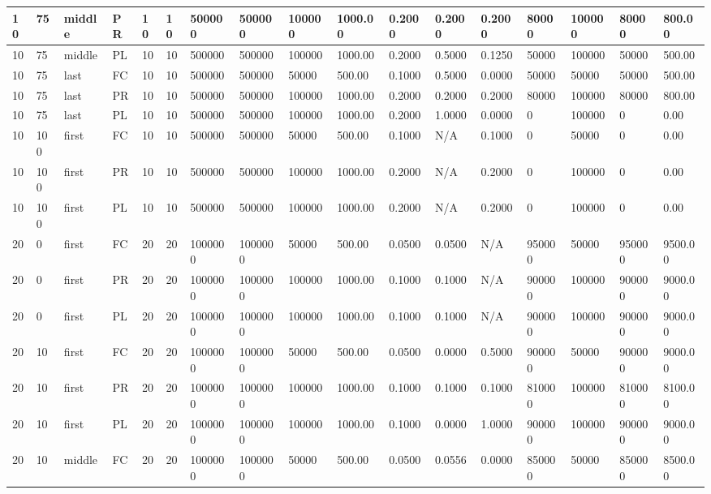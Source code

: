 \begin{tabular}{|l|l|l|l|l|l|l|l|l|l|l|l|l|l|l|l|l|}
10 & 75 & middle & PR & 10 & 10 & 500000 & 500000 & 100000 & 1000.00 & 0.2000 & 0.2000 & 0.2000 & 80000 & 100000 & 80000 & 800.00 \\ \hline
10 & 75 & middle & PL & 10 & 10 & 500000 & 500000 & 100000 & 1000.00 & 0.2000 & 0.5000 & 0.1250 & 50000 & 100000 & 50000 & 500.00 \\ \hline
10 & 75 & last & FC & 10 & 10 & 500000 & 500000 & 50000 & 500.00 & 0.1000 & 0.5000 & 0.0000 & 50000 & 50000 & 50000 & 500.00 \\ \hline
10 & 75 & last & PR & 10 & 10 & 500000 & 500000 & 100000 & 1000.00 & 0.2000 & 0.2000 & 0.2000 & 80000 & 100000 & 80000 & 800.00 \\ \hline
10 & 75 & last & PL & 10 & 10 & 500000 & 500000 & 100000 & 1000.00 & 0.2000 & 1.0000 & 0.0000 & 0 & 100000 & 0 & 0.00 \\ \hline
10 & 100 & first & FC & 10 & 10 & 500000 & 500000 & 50000 & 500.00 & 0.1000 & N/A & 0.1000 & 0 & 50000 & 0 & 0.00 \\ \hline
10 & 100 & first & PR & 10 & 10 & 500000 & 500000 & 100000 & 1000.00 & 0.2000 & N/A & 0.2000 & 0 & 100000 & 0 & 0.00 \\ \hline
10 & 100 & first & PL & 10 & 10 & 500000 & 500000 & 100000 & 1000.00 & 0.2000 & N/A & 0.2000 & 0 & 100000 & 0 & 0.00 \\ \hline
20 & 0 & first & FC & 20 & 20 & 1000000 & 1000000 & 50000 & 500.00 & 0.0500 & 0.0500 & N/A & 950000 & 50000 & 950000 & 9500.00 \\ \hline
20 & 0 & first & PR & 20 & 20 & 1000000 & 1000000 & 100000 & 1000.00 & 0.1000 & 0.1000 & N/A & 900000 & 100000 & 900000 & 9000.00 \\ \hline
20 & 0 & first & PL & 20 & 20 & 1000000 & 1000000 & 100000 & 1000.00 & 0.1000 & 0.1000 & N/A & 900000 & 100000 & 900000 & 9000.00 \\ \hline
20 & 10 & first & FC & 20 & 20 & 1000000 & 1000000 & 50000 & 500.00 & 0.0500 & 0.0000 & 0.5000 & 900000 & 50000 & 900000 & 9000.00 \\ \hline
20 & 10 & first & PR & 20 & 20 & 1000000 & 1000000 & 100000 & 1000.00 & 0.1000 & 0.1000 & 0.1000 & 810000 & 100000 & 810000 & 8100.00 \\ \hline
20 & 10 & first & PL & 20 & 20 & 1000000 & 1000000 & 100000 & 1000.00 & 0.1000 & 0.0000 & 1.0000 & 900000 & 100000 & 900000 & 9000.00 \\ \hline
20 & 10 & middle & FC & 20 & 20 & 1000000 & 1000000 & 50000 & 500.00 & 0.0500 & 0.0556 & 0.0000 & 850000 & 50000 & 850000 & 8500.00 \\ \hline

\end{tabular}
